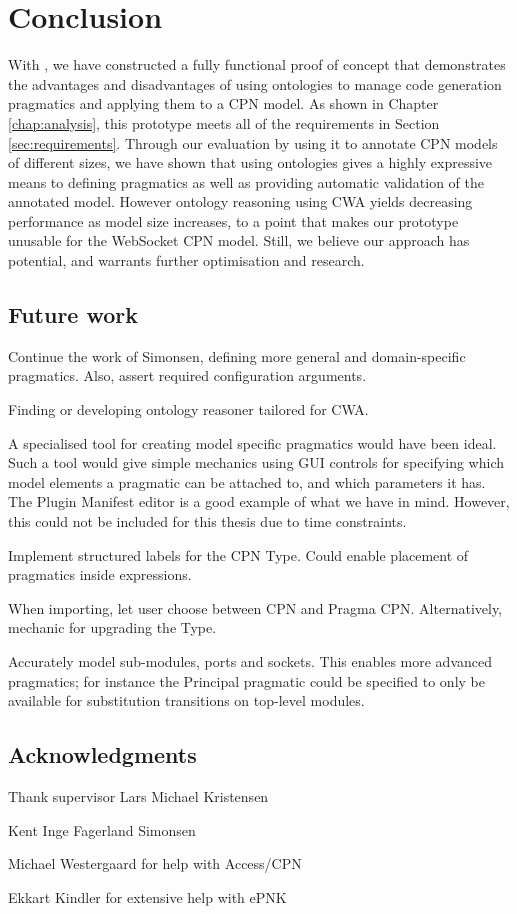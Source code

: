 \chapter{Conclusion}
\label{chap:conclusion}

With \thename{}, we have constructed a fully functional proof of concept that
demonstrates the advantages and disadvantages of using ontologies to manage code
generation pragmatics and applying them to a CPN model. As shown in Chapter
\ref{chap:analysis}, this prototype meets all of the requirements in Section
\ref{sec:requirements}. Through our evaluation by using it to annotate CPN
models of different sizes, we have shown that using ontologies gives a highly
expressive means to defining pragmatics as well as providing automatic
validation of the annotated model. However ontology reasoning using CWA yields
decreasing performance as model size increases, to a point that makes our
prototype unusable for the WebSocket CPN model. Still, we believe our approach
has potential, and warrants further optimisation and research.

\section{Future work}

Continue the work of Simonsen, defining more general and domain-specific
pragmatics. Also, assert required configuration arguments.

Finding or developing ontology reasoner tailored for CWA.

A specialised tool for creating model specific pragmatics would have been ideal.
Such a tool would give simple mechanics using GUI controls for specifying which
model elements a pragmatic can be attached to, and which parameters it has. The
Plugin Manifest editor is a good example of what we have in mind. However, this
could not be included for this thesis due to time constraints.

Implement structured labels for the CPN Type. Could enable placement of
pragmatics inside expressions.

When importing, let user choose between CPN and Pragma CPN. Alternatively,
mechanic for upgrading the Type.

Accurately model sub-modules, ports and sockets. This enables more advanced
pragmatics; for instance the Principal pragmatic could be specified to only be
available for substitution transitions on top-level modules.

\section{Acknowledgments}

Thank supervisor Lars Michael Kristensen

Kent Inge Fagerland Simonsen 

Michael Westergaard for help with Access/CPN

Ekkart Kindler for extensive help with ePNK
